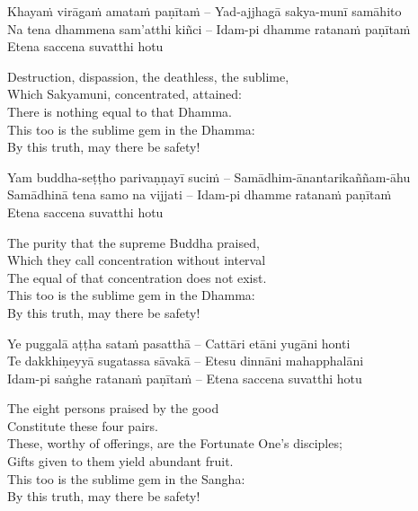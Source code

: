 Khayaṁ virāgaṁ amataṁ paṇītaṁ – Yad-ajjhagā sakya-munī samāhito\\
Na tena dhammena sam'atthi kiñci – Idam-pi dhamme ratanaṁ paṇītaṁ\\
Etena saccena suvatthi hotu

\begin{english-verses}
  Destruction, dispassion, the deathless, the sublime,\\
  Which Sakyamuni, concentrated, attained:\\
  There is nothing equal to that Dhamma.\\
  This too is the sublime gem in the Dhamma:\\
  By this truth, may there be safety!
\end{english-verses}

Yam buddha-seṭṭho parivaṇṇayī suciṁ – Samādhim-ānantarikaññam-āhu\\
Samādhinā tena samo na vijjati – Idam-pi dhamme ratanaṁ paṇītaṁ\\
Etena saccena suvatthi hotu

\begin{english-verses}
  The purity that the supreme Buddha praised,\\
  Which they call concentration without interval\\
  The equal of that concentration does not exist.\\
  This too is the sublime gem in the Dhamma:\\
  By this truth, may there be safety!
\end{english-verses}

Ye puggalā aṭṭha sataṁ pasatthā – Cattāri etāni yugāni honti\\
Te dakkhiṇeyyā sugatassa sāvakā – Etesu dinnāni mahapphalāni\\
Idam-pi saṅghe ratanaṁ paṇītaṁ – Etena saccena suvatthi hotu

\begin{english-verses}
  The eight persons praised by the good\\
  Constitute these four pairs.\\
  These, worthy of offerings, are the Fortunate One's disciples;\\
  Gifts given to them yield abundant fruit.\\
  This too is the sublime gem in the Sangha:\\
  By this truth, may there be safety!
\end{english-verses}

